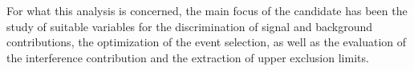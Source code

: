 For what this analysis is concerned, the main focus of the candidate has been the study of suitable variables for the discrimination of signal and background contributions, the optimization of the event selection, as well as the evaluation of the interference contribution and the extraction of upper exclusion limits.

%






